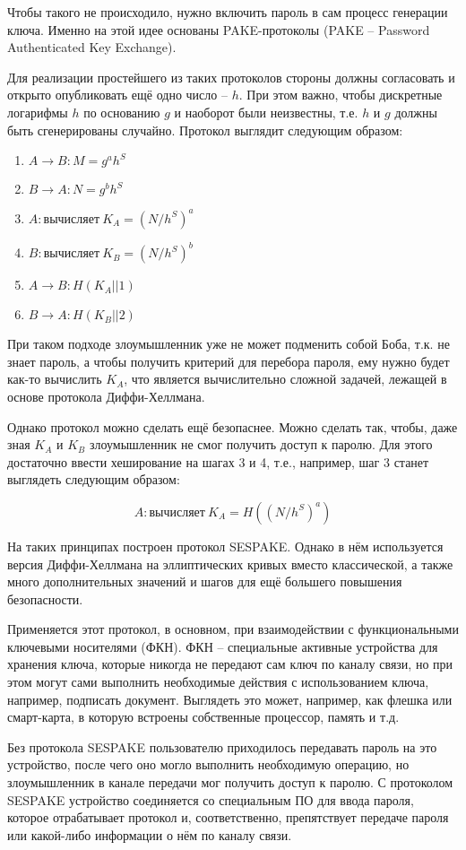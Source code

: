 Чтобы такого не происходило, нужно включить пароль в сам процесс генерации ключа. Именно на этой идее основаны PAKE-протоколы (PAKE -- Password Authenticated Key Exchange).

Для реализации простейшего из таких протоколов стороны должны согласовать и открыто опубликовать ещё одно число -- $h$. При этом важно, чтобы дискретные логарифмы $h$ по основанию $g$ и наоборот были неизвестны, т.е. $h$ и $g$ должны быть сгенерированы случайно. Протокол выглядит следующим образом:

\begin{enumerate}
	\item $A \rightarrow B: M = g^ah^S$
	\item $B \rightarrow A: N = g^bh^S$
	\item $A: \text{вычисляет}\ K_A = (N/h^S)^a$
	\item $B: \text{вычисляет}\ K_B = (N/h^S)^b$
	\item $A \rightarrow B: H(K_A || 1)$
	\item $B \rightarrow A: H(K_B || 2)$
\end{enumerate}

При таком подходе злоумышленник уже не может подменить собой Боба, т.к. не знает пароль,  а чтобы получить критерий для перебора пароля, ему нужно будет как-то вычислить $K_A$, что является вычислительно сложной задачей, лежащей в основе протокола Диффи-Хеллмана.

Однако протокол можно сделать ещё безопаснее. Можно сделать так, чтобы, даже зная $K_A$ и $K_B$ злоумышленник не смог получить доступ к паролю. Для этого достаточно ввести хеширование на шагах 3 и 4, т.е., например, шаг 3 станет выглядеть следующим образом:

$$A: \text{вычисляет}\ K_A = H((N/h^S)^a)$$

На таких принципах построен протокол SESPAKE. Однако в нём используется версия Диффи-Хеллмана на эллиптических кривых вместо классической, а также много дополнительных значений и шагов для ещё большего повышения безопасности. 

Применяется этот протокол, в основном, при взаимодействии с функциональными ключевыми носителями (ФКН). ФКН -- специальные активные устройства для хранения ключа, которые никогда не передают сам ключ по каналу связи, но при этом могут сами выполнить необходимые действия с использованием ключа, например, подписать документ. Выглядеть это может, например, как флешка или смарт-карта, в которую встроены собственные процессор, память и т.д.

Без протокола SESPAKE пользователю приходилось передавать пароль на это устройство, после чего оно могло выполнить необходимую операцию, но злоумышленник в канале передачи мог получить доступ к паролю. С протоколом SESPAKE устройство соединяется со специальным ПО для ввода пароля, которое отрабатывает протокол и, соответственно, препятствует передаче пароля или какой-либо информации о нём по каналу связи.

